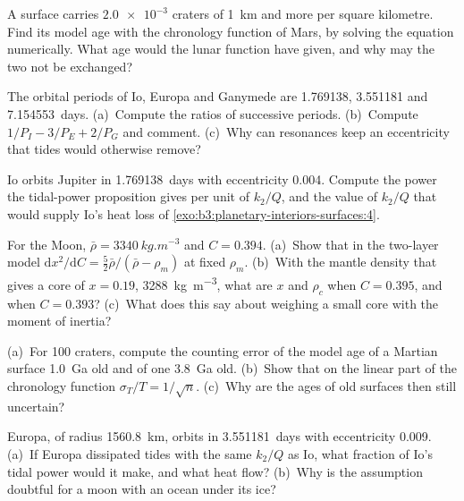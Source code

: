 \begin{exercise}[$\star\star$]\label{exo:b3:planetary-interiors-surfaces:7}
A surface carries $\num{2.0e-3}$ craters of \qty{1}{km} and more per
square kilometre. Find its model age with the chronology function of Mars,
by solving the equation numerically. What age would the lunar function have
given, and why may the two not be exchanged?
\end{exercise}

\begin{exercise}[$\star\star$]\label{exo:b3:planetary-interiors-surfaces:8}
The orbital periods of Io, Europa and Ganymede are 1.769138, 3.551181 and
\num{7.154553}~days. (a)~Compute the ratios of successive periods.
(b)~Compute $1/P_I - 3/P_E + 2/P_G$ and comment. (c)~Why can resonances
keep an eccentricity that tides would otherwise remove?
\end{exercise}

\begin{exercise}[$\star\star$]\label{exo:b3:planetary-interiors-surfaces:9}
Io orbits Jupiter in \num{1.769138}~days with eccentricity 0.004.
Compute the power the tidal-power proposition gives per unit of $k_2/Q$,
and the value of $k_2/Q$ that would supply Io's heat loss of
\cref{exo:b3:planetary-interiors-surfaces:4}.
\end{exercise}

\begin{exercise}[$\star\star\star$]\label{exo:b3:planetary-interiors-surfaces:10}
For the Moon, $\bar\rho = \qty{3340}{kg.m^{-3}}$ and $C = 0.394$.
(a)~Show that in the two-layer model $\mathrm dx^2/\mathrm dC =
\tfrac52\bar\rho/(\bar\rho - \rho_m)$ at fixed $\rho_m$. (b)~With the
mantle density that gives a core of $x = 0.19$, \qty{3288}{kg.m^{-3}},
what are $x$ and $\rho_c$ when $C = 0.395$, and when $C = 0.393$?
(c)~What does this say about weighing a small core with the moment of
inertia?
\end{exercise}

\begin{exercise}[$\star\star\star$]\label{exo:b3:planetary-interiors-surfaces:11}
(a)~For 100 craters, compute the counting error of the model age of a
Martian surface \qty{1.0}{Ga} old and of one \qty{3.8}{Ga} old.
(b)~Show that on the linear part of the chronology function $\sigma_T/T =
1/\sqrt n$. (c)~Why are the ages of old surfaces then still uncertain?
\end{exercise}

\begin{exercise}[$\star\star\star$]\label{exo:b3:planetary-interiors-surfaces:12}
Europa, of radius \qty{1560.8}{km}, orbits in \num{3.551181}~days with
eccentricity 0.009. (a)~If Europa dissipated tides with the same $k_2/Q$
as Io, what fraction of Io's tidal power would it make, and what heat flow?
(b)~Why is the assumption doubtful for a moon with an ocean under its ice?
\end{exercise}

